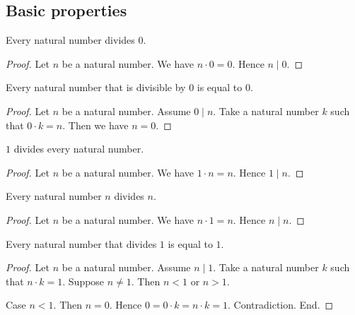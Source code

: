 \documentclass[../../natural-numbers.ftl.tex]{subfiles}
\begin{document}
  \subsection{Basic properties}

  \begin{forthel}
    \begin{proposition}[NN 03 01 148842]
      Every natural number divides $0$.
    \end{proposition}
    \begin{proof}
      Let $n$ be a natural number.
      We have $n \cdot 0 = 0$.
      Hence $n \mid 0$.
    \end{proof}

    \begin{proposition}[NN 03 01 295259]
      Every natural number that is divisible by $0$ is equal to $0$.
    \end{proposition}
    \begin{proof}
      Let $n$ be a natural number.
      Assume $0 \mid n$.
      Take a natural number $k$ such that $0 \cdot k = n$.
      Then we have $n = 0$.
    \end{proof}

    \begin{proposition}[NN 03 01 856465]
      $1$ divides every natural number.
    \end{proposition}
    \begin{proof}
      Let $n$ be a natural number.
      We have $1 \cdot n = n$.
      Hence $1 \mid n$.
    \end{proof}

    \begin{proposition}[NN 03 01 258975]
      Every natural number $n$ divides $n$.
    \end{proposition}
    \begin{proof}
      Let $n$ be a natural number.
      We have $n \cdot 1 = n$.
      Hence $n \mid n$.
    \end{proof}

    \begin{proposition}[NN 03 01 211137]
      Every natural number that divides $1$ is equal to $1$.
    \end{proposition}
    \begin{proof}
      Let $n$ be a natural number.
      Assume $n \mid 1$.
      Take a natural number $k$ such that $n \cdot k = 1$.
      Suppose $n \neq 1$.
      Then $n < 1$ or $n > 1$.

      Case $n < 1$.
        Then $n = 0$.
        Hence $0 = 0 \cdot k = n \cdot k = 1$.
        Contradiction.
      End.


\end{proof}
\end{forthel}
\end{document}
